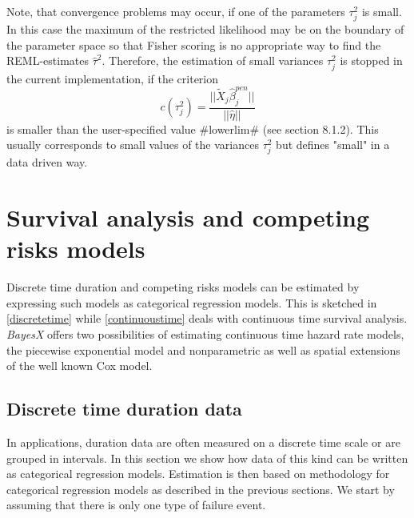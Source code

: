 \documentclass[11pt,a4paper,twoside]{bayesxarticle}
\begin{document}
Note, that convergence problems may occur, if one of the
parameters $\tau_j^2$ is small. In this case the maximum of the
restricted likelihood may be on the boundary of the parameter
space so that Fisher scoring is no appropriate way to find the
REML-estimates $\hat{\tau}^2$. Therefore, the estimation of small
variances $\tau_j^2$ is stopped in the current implementation, if
the criterion
\begin{equation}\label{remlstopcrit}
 c(\tau_j^2)=\frac{||\tilde{X}_j\hat{\beta}_j^{pen}||}{||\hat{\eta}||}
\end{equation}
is smaller than the user-specified value #lowerlim# (see section
8.1.2). This usually corresponds to small values of the variances
$\tau_j^2$ but defines "small" in a data driven way.

\section{Survival analysis and competing risks models}
\label{survivalAnalysis}

Discrete time duration and competing risks models can be estimated
by expressing such models as categorical regression models. This
is sketched in \autoref{discretetime} while
\autoref{continuoustime} deals with continuous time survival
analysis. \textit{BayesX} offers two possibilities of estimating
continuous time hazard rate models, the piecewise exponential
model and nonparametric as well as spatial extensions of the well
known Cox model.


\subsection{Discrete time duration data}
\label{discretetime}

In applications, duration data are often measured on a discrete
time scale or are grouped in intervals. In this section we show
how data of this kind can be written as categorical regression
models.  Estimation is then based on methodology for categorical
regression models as described in the previous sections. We start
by assuming that there is only one type of failure event.
\end{document}

